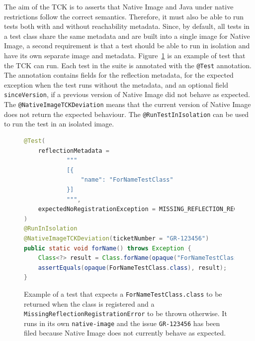 The aim of the TCK is to asserts that Native Image and Java under native restrictions follow the correct semantics. Therefore, it must also be able to run tests both with and without reachability metadata. Since, by default, all tests in a test class share the same metadata and are built into a single image for Native Image, a second requirement is that a test should be able to run in isolation and have its own separate image and metadata. 
Figure~\ref{fig:tck_for_name} is an example of test that the TCK can run. Each test in the suite is annotated with the \verb|@Test| annotation. The annotation contains fields for the reflection metadata, for the expected exception when the test runs without the metadata, and an optional field \verb|sinceVersion|, if a previous version of Native Image did not behave as expected. The \verb|@NativeImageTCKDeviation| means that the current version of Native Image does not return the expected behaviour. The \verb|@RunTestInIsolation| can be used to run the test in an isolated image. 

\begin{figure}[ht]
    \centering
\begin{lstlisting}[language=Java]
@Test(
    reflectionMetadata =
            """
            [{
                "name": "ForNameTestClass"
            }]
            """,
    expectedNoRegistrationException = MISSING_REFLECTION_REGISTRATION_ERROR
)
@RunInIsolation
@NativeImageTCKDeviation(ticketNumber = "GR-123456")
public static void forName() throws Exception {
    Class<?> result = Class.forName(opaque("ForNameTestClass"));
    assertEquals(opaque(ForNameTestClass.class), result);
}
\end{lstlisting}
    \caption{Example of a test that expects a \texttt{ForNameTestClass.class} to be returned when the class is registered and a \texttt{MissingReflectionRegistrationError} to be thrown otherwise. It runs in its own \texttt{native-image} and the issue \texttt{GR-123456} has been filed because Native Image does not currently behave as expected.}
    \label{fig:tck_for_name}
\end{figure}

